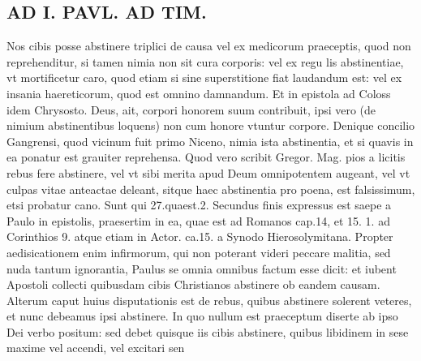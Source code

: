 \documentclass{article}
\begin{document}
\begin{pages}
\section*{AD I. PAVL. AD TIM. }
\marginpar{[ p.310 ]}\pstart Nos cibis posse abstinere triplici de causa vel ex medicorum praeceptis, quod non reprehenditur, si tamen nimia non sit cura corporis: vel ex regu lis abstinentiae, vt mortificetur caro, quod etiam si sine superstitione fiat laudandum est: vel ex insania haereticorum, quod est omnino damnandum. Et in epistola ad Coloss idem Chrysosto. Deus, ait, corpori honorem suum contribuit, ipsi vero (de nimium abstinentibus loquens) non cum honore vtuntur corpore. Denique concilio Gangrensi, quod vicinum fuit primo Niceno, nimia ista abstinentia, et si quavis in ea ponatur est grauiter reprehensa. Quod vero scribit Gregor. Mag. pios a licitis rebus fere abstinere, vel vt sibi merita apud Deum omnipotentem augeant, vel vt culpas vitae anteactae deleant, sitque haec abstinentia pro poena, est falsissimum, etsi probatur cano. Sunt qui 27.quaest.2. Secundus finis expressus est saepe a Paulo in epistolis, praesertim in ea, quae est ad Romanos cap.14, et 15. 1. ad Corinthios 9. atque etiam in Actor. ca.15. a Synodo Hierosolymitana. Propter aedisicationem enim infirmorum, qui non poterant videri peccare malitia, sed nuda tantum ignorantia, Paulus se omnia omnibus factum esse dicit: et iubent Apostoli collecti quibusdam cibis Christianos abstinere ob eandem causam. Alterum caput huius disputationis est de rebus, quibus abstinere solerent veteres, et nunc debeamus ipsi abstinere. In quo nullum est praeceptum diserte ab ipso Dei verbo positum: sed debet quisque iis cibis abstinere, quibus libidinem in sese maxime vel accendi, vel excitari sen\pend

\end{pages}
\end{document}
